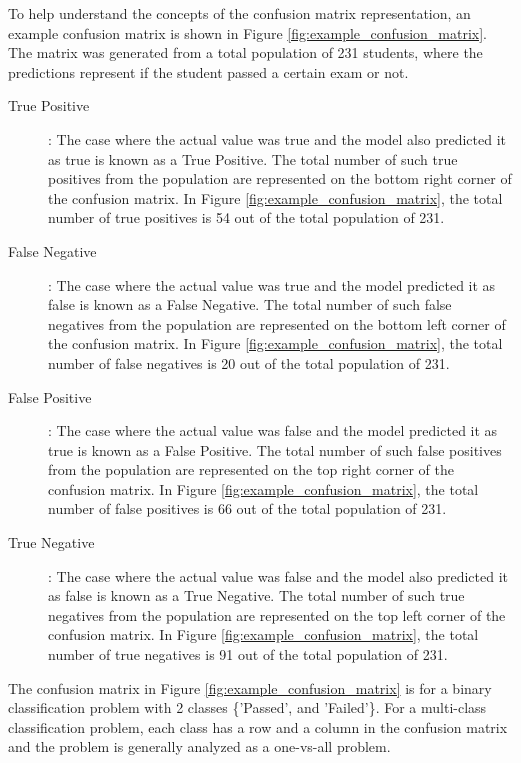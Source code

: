 \documentclass[11pt,openright]{report}
\begin{document}
To help understand the concepts of the confusion matrix representation, an example confusion matrix is shown in Figure \ref{fig:example_confusion_matrix}. The matrix was generated from a total population of 231 students, where the predictions represent if the student passed a certain exam or not. 
\begin{description}
    \item[True Positive] : The case where the actual value was true and the model also predicted it as true is known as a True Positive. The total number of such true positives from the population are represented on the bottom right corner of the confusion matrix. In Figure \ref{fig:example_confusion_matrix}, the total number of true positives is 54 out of the total population of 231.

    \item[False Negative] : The case where the actual value was true and the model predicted it as false is known as a False Negative. The total number of such false negatives from the population are represented on the bottom left corner of the confusion matrix. In Figure \ref{fig:example_confusion_matrix}, the total number of false negatives is 20 out of the total population of 231.

     \item[False Positive] : The case where the actual value was false and the model predicted it as true is known as a False Positive. The total number of such false positives from the population are represented on the top right corner of the confusion matrix. In Figure \ref{fig:example_confusion_matrix}, the total number of false positives is 66 out of the total population of 231.
     
      \item[True Negative] : The case where the actual value was false and the model also predicted it as false is known as a True Negative. The total number of such true negatives from the population are represented on the top left corner of the confusion matrix. In Figure \ref{fig:example_confusion_matrix}, the total number of true negatives is 91 out of the total population of 231.
     
 \end{description}
 The confusion matrix in Figure \ref{fig:example_confusion_matrix} is for a binary classification problem with 2 classes \{'Passed', and 'Failed'\}. For a multi-class classification problem, each class has a row and a column in the confusion matrix and the problem is generally analyzed as a one-vs-all problem.
\end{document}
